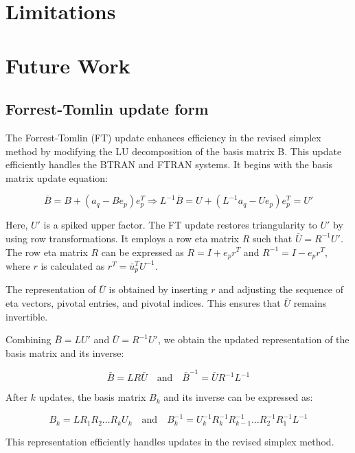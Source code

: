 

\section{Limitations}

\section{Future Work}
\subsection{Forrest-Tomlin update form}
The Forrest-Tomlin (FT) update enhances efficiency in the
revised simplex method by modifying the LU decomposition of the basis matrix B.
This update efficiently handles the BTRAN and FTRAN systems.
It begins with the basis matrix update equation:

\[
    \bar{B} = B + (a_q - B e_p) e_p^T \Rightarrow L^{-1} \bar{B} = U + (L^{-1}a_q - U e_p) e_p^T = U'
\]

Here, \(U'\) is a spiked upper factor.
The FT update restores triangularity to \(U'\) by using row transformations.
It employs a row eta matrix \(R\) such that \(\bar{U} = R^{-1}U'\). 
The row eta matrix \(R\) can be expressed as \(R = I + e_p r^T\) and \(R^{-1} = I - e_p r^T\), where \(r\) is calculated as \(r^T = \bar{u}_p^T U^{-1}\).

The representation of \(\bar{U}\) is obtained by inserting \(r\) and 
adjusting the sequence of eta vectors, pivotal entries, and pivotal indices. 
This ensures that \(\bar{U}\) remains invertible.

Combining \(\bar{B} = LU'\) and \(\bar{U} = R^{-1}U'\), we obtain the 
updated representation of the basis matrix and its inverse:

\[
    \bar{B} = LR \bar{U} \quad \text{and} \quad \bar{B}^{-1} 
    = \bar{U}R^{-1}L^{-1}
\]

After \(k\) updates, the basis matrix \(B_k\) and its inverse can 
be expressed as:

\[
    B_k = LR_1R_2 \ldots R_kU_k \quad \text{and} \quad B_k^{-1} 
    = U_k^{-1}R_k^{-1}R_{k-1}^{-1} \ldots R_2^{-1}R_1^{-1}L^{-1}
\]

This representation efficiently handles updates in the revised simplex method.

